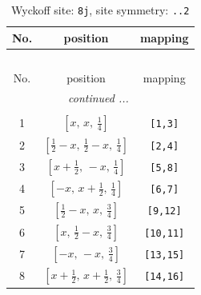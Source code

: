 \documentclass[fleqn,8pt]{jsarticle}
\begin{document}
\begin{longtable}{ccc}
\caption{Wyckoff site: {\tt 8j}, site symmetry: {\tt ..2}}
 \\
 \hline \hline
No. & position & mapping \\ \hline \endfirsthead

\multicolumn{2}{l}{\tablename\ \thetable{}} \\
 \hline \hline
No. & position & mapping \\ \hline \endhead

 \hline \hline
\multicolumn{2}{r}{\footnotesize\it continued ...} \\ \endfoot

 \hline \hline
\multicolumn{2}{r}{} \\ \endlastfoot

1 & $\left[ x,\, x,\, \frac{1}{4} \right]$ & {\tt [1,3]} \\ \hline
2 & $\left[ \frac{1}{2} - x,\, \frac{1}{2} - x,\, \frac{1}{4} \right]$ & {\tt [2,4]} \\ \hline
3 & $\left[ x + \frac{1}{2},\, - x,\, \frac{1}{4} \right]$ & {\tt [5,8]} \\ \hline
4 & $\left[ - x,\, x + \frac{1}{2},\, \frac{1}{4} \right]$ & {\tt [6,7]} \\ \hline
5 & $\left[ \frac{1}{2} - x,\, x,\, \frac{3}{4} \right]$ & {\tt [9,12]} \\ \hline
6 & $\left[ x,\, \frac{1}{2} - x,\, \frac{3}{4} \right]$ & {\tt [10,11]} \\ \hline
7 & $\left[ - x,\, - x,\, \frac{3}{4} \right]$ & {\tt [13,15]} \\ \hline
8 & $\left[ x + \frac{1}{2},\, x + \frac{1}{2},\, \frac{3}{4} \right]$ & {\tt [14,16]} \\
\end{longtable}
\renewcommand{\arraystretch}{1.2}
\end{document}
